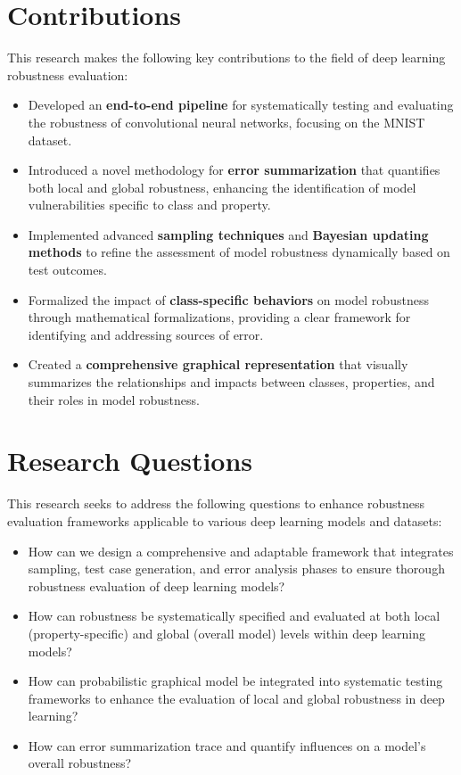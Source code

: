 \documentclass[10pt, conference, a4paper, final]{IEEEtran}
\begin{document}
\section{Contributions}
This research makes the following key contributions to the field of deep learning robustness evaluation:
\begin{itemize}
    \item Developed an \textbf{end-to-end pipeline} for systematically testing and evaluating the robustness of convolutional neural networks, focusing on the MNIST dataset.
    \item Introduced a novel methodology for \textbf{error summarization} that quantifies both local and global robustness, enhancing the identification of model vulnerabilities specific to class and property.
    \item Implemented advanced \textbf{sampling techniques} and \textbf{Bayesian updating methods} to refine the assessment of model robustness dynamically based on test outcomes.
    \item Formalized the impact of \textbf{class-specific behaviors} on model robustness through mathematical formalizations, providing a clear framework for identifying and addressing sources of error.
    \item Created a \textbf{comprehensive graphical representation} that visually summarizes the relationships and impacts between classes, properties, and their roles in model robustness.
\end{itemize}

\section{Research Questions}
This research seeks to address the following questions to enhance robustness evaluation frameworks applicable to various deep learning models and datasets:
\begin{itemize}
    \item How can we design a comprehensive and adaptable framework that integrates sampling, test case generation, and error analysis phases to ensure thorough robustness evaluation of deep learning models?
    \item How can robustness be systematically specified and evaluated at both local (property-specific) and global (overall model) levels within deep learning models?
    \item How can probabilistic graphical model be integrated into systematic testing frameworks to enhance the evaluation of local and global robustness in deep learning?
    \item  How can error summarization trace and quantify influences on a model’s overall robustness?
 
\end{itemize}
\end{document}
